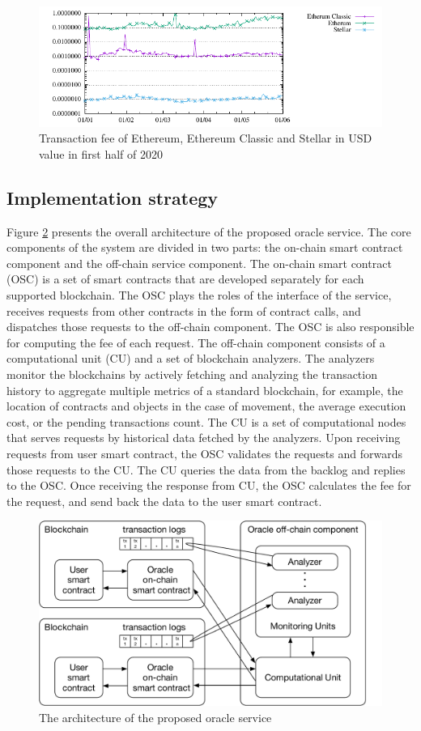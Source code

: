 \begin{figure}[ht!]
\begin{minipage}[b]{1\linewidth}
\centering
      \includegraphics[width=0.6\linewidth]{figures/transaction-fee-mean-usd}
\end{minipage}
\caption{Transaction fee of Ethereum, Ethereum Classic and Stellar in USD value in first half of 2020}
\label{fig:transaction-fee}
\end{figure}

\subsection{Implementation strategy}
\label{sec:strategy}
Figure \ref{fig:architecture} presents the overall architecture of the
proposed oracle service. The core components of the system are divided in two
parts: the on-chain smart contract component and the off-chain service
component. The on-chain smart contract (OSC) is a set of smart contracts that
are developed separately for each supported blockchain. The OSC plays the roles
of the interface of the service, receives requests from other contracts in the
form of contract calls, and dispatches those requests to the off-chain component.
The OSC is also responsible for computing the fee of each request. The off-chain
component consists of a computational unit (CU) and a set of blockchain
analyzers. The analyzers monitor the blockchains by actively fetching and
analyzing the transaction history to aggregate multiple metrics of a standard
blockchain, for example, the location of contracts and objects in the case of
movement, the average execution cost, or the pending transactions count. The
CU is a set of computational nodes that serves requests by historical data
fetched by the analyzers. Upon receiving requests from user smart contract, the
OSC validates the requests and forwards those requests to the CU. The CU queries
the data from the backlog and replies to the OSC. Once receiving the response from CU,
the OSC calculates the fee for the request, and send back the data to the user
smart contract.

\begin{figure}[ht!]
\begin{minipage}[b]{1\linewidth}
\centering
      \includegraphics[width=0.6\linewidth]{figures/architecture}
\end{minipage}
\caption{The architecture of the proposed oracle service}
\label{fig:architecture}
\end{figure}

